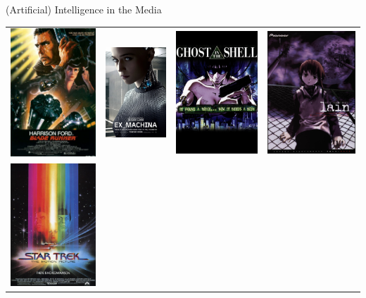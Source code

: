 \documentclass[xcolor={usenames,svgnames,x11names,dvipsnames,table}]{beamer}
\begin{document}
\begin{frame}{(Artificial) Intelligence in the Media}
    \begin{center}
        \begin{tabular}{cccc}
            \includegraphics[width=.2\linewidth]{./img/bladerunner}
            &
            \includegraphics[width=.2\linewidth]{./img/exmachina}
            &
            \includegraphics[width=.2\linewidth]{./img/ghostintheshell}
            &
            \includegraphics[width=.2\linewidth]{./img/serialexperimentslain}
            \\
            \includegraphics[width=.2\linewidth]{./img/startrek1}

\end{tabular}
\end{center}
\end{frame}
\end{document}
